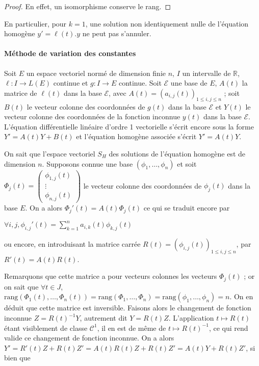 \begin{proof}
En effet, un isomorphisme conserve le rang.
\end{proof}

\begin{rem}
En particulier, pour $k = 1$, une solution non
identiquement nulle de l'équation homogène $y' = \ell(t).y$ ne peut pas
s'annuler.
\end{rem}

\paragraph{Méthode de variation des constantes}

Soit $E$ un espace vectoriel normé de dimension finie $n$, $I$ un intervalle
de $\mathbb{R}$, $\ell : I \rightarrow L(E)$ continue et $g : I \rightarrow E$ continue. Soit $\mathcal{E}$ une base de $E$,
$A(t)$ la matrice de $\ell(t)$ dans la base $\mathcal{E}$, avec $A(t) =
(a_{i,j}(t))_{1 \leq i,j \leq n}$ ; soit $B(t)$ le vecteur colonne des
coordonnées de $g(t)$ dans la base $\mathcal{E}$ et $Y(t)$ le vecteur colonne des
coordonnées de la fonction inconnue $y(t)$ dans la base $\mathcal{E}$. L'équation
différentielle linéaire d'ordre 1 vectorielle s'écrit encore sous la
forme $Y' = A(t)Y + B(t)$ et l'équation homogène associée s'écrit $Y' =
A(t)Y$.

On sait que l'espace vectoriel $S_H$ des solutions de l'équation
homogène est de dimension $n$. Supposons connue une base
$(\phi_1,\ldots,\phi_n)$
et soit $\Phi_j(t) = \begin{pmatrix} \phi_{1,j}(t) \\ \vdots \\ \phi_{n,j}(t) \end{pmatrix}$ le vecteur
colonne des coordonnées de $\phi_j(t)$ dans la base $E$. On a alors
$\Phi_j'(t) = A(t)\Phi_j(t)$ ce qui se traduit encore par

$\forall i,j, \phi_{i,j}'(t) = \sum_{k=1}^n a_{i,k}(t)\phi_{k,j}(t)$

ou encore, en introduisant la matrice carrée $R(t) =
(\phi_{i,j}(t))_{1 \leq i,j \leq n}$, par $R'(t) = A(t)R(t)$.

Remarquons que cette matrice a pour vecteurs colonnes les vecteurs
$\Phi_j(t)$ ; or on sait que $\forall t \in J$,
$\text{rang}(\Phi_1(t),\ldots,\Phi_n(t)) = \text{rang}(\Phi_1,\ldots,\Phi_n) = \text{rang}(\phi_1,\ldots,\phi_n) = n$. On en déduit que cette matrice est inversible. Faisons alors le
changement de fonction inconnue $Z = R(t)^{-1}Y$, autrement dit
$Y = R(t)Z$. L'application $t \mapsto R(t)$ étant
visiblement de classe $\mathcal{C}^1$, il en est de même de
$t \mapsto R(t)^{-1}$, ce qui rend valide ce
changement de fonction inconnue. On a alors $Y' = R'(t)Z + R(t)Z' =
A(t)R(t)Z + R(t)Z' = A(t)Y + R(t)Z'$, si bien que

